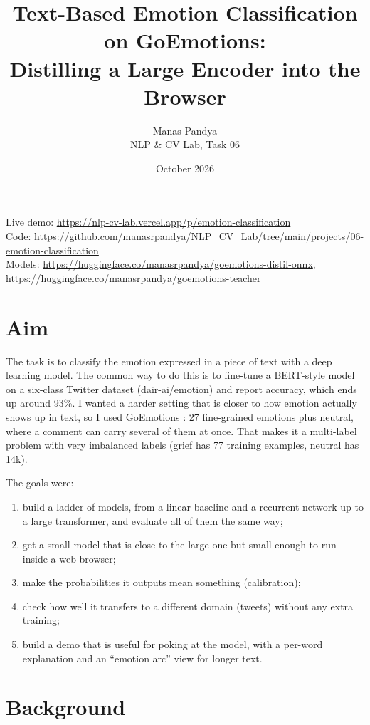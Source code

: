 \documentclass[11pt,a4paper]{article}
\title{Text-Based Emotion Classification on GoEmotions:\\Distilling a Large Encoder into the Browser}
\author{Manas Pandya\\[0.2em]\small NLP \& CV Lab, Task 06}
\date{October 2026}
\begin{document}
\maketitle

\begin{center}
\small
Live demo: \url{https://nlp-cv-lab.vercel.app/p/emotion-classification}\\
Code: \url{https://github.com/manasrpandya/NLP_CV_Lab/tree/main/projects/06-emotion-classification}\\
Models: \url{https://huggingface.co/manasrpandya/goemotions-distil-onnx},
\url{https://huggingface.co/manasrpandya/goemotions-teacher}
\end{center}

\section{Aim}

The task is to classify the emotion expressed in a piece of text with a deep learning model. The common way
to do this is to fine-tune a BERT-style model on a six-class Twitter dataset (dair-ai/emotion) and report
accuracy, which ends up around 93\%. I wanted a harder setting that is closer to how emotion actually shows
up in text, so I used GoEmotions \cite{goemotions}: 27 fine-grained emotions plus neutral, where a comment can
carry several of them at once. That makes it a multi-label problem with very imbalanced labels (grief has 77
training examples, neutral has 14k).

The goals were:
\begin{enumerate}
\itemsep0em
\item[(a)] build a ladder of models, from a linear baseline and a recurrent network up to a large transformer,
and evaluate all of them the same way;
\item[(b)] get a small model that is close to the large one but small enough to run inside a web browser;
\item[(c)] make the probabilities it outputs mean something (calibration);
\item[(d)] check how well it transfers to a different domain (tweets) without any extra training;
\item[(e)] build a demo that is useful for poking at the model, with a per-word explanation and an
``emotion arc'' view for longer text.
\end{enumerate}

\section{Background}
\end{document}
